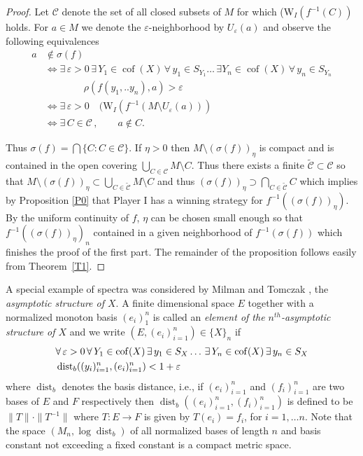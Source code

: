 \documentclass[11pt,leqno]{amsart}
\theoremstyle{definition}
\newcommand{\vp}{\varepsilon}
\newcommand{\dist}{\operatorname{dist}}
\newcommand{\cof}{\operatorname{cof}}
\newcommand{\cC}{\mathcal{C}}
\begin{document}
\begin{proof}
Let $\cC$ denote the set of all closed subsets of $M$ for
which  (W$_{I}(f^{-1}(C))$ holds. 
For $a\in M$ we denote the $\vp$-neighborhood by $U_\vp(a)$
and observe the following equivalences
\begin{align*}
a&\not\in\sigma(f)\\
&\iff\exists\, \vp>0\,\exists\, Y_1\in\cof(X)\,\forall\, y_1\in S_{Y_1}\ldots
\,\exists Y_n\in\cof(X)\,\forall\, y_n\in S_{Y_n}\\
  &\qquad\qquad \rho(f(y_1,..y_n),a)>\vp\\
  &\iff \exists\, \vp>0 \quad (\text{W}_{I}(f^{-1}(M\setminus U_\vp(a)))  \\
  &\iff \exists\, C\in\cC\,,\qquad a\not\in C.
  \end{align*}
 
Thus $\sigma(f)=\bigcap \{C:C\in \cC\}$. 
If $\eta>0$ then $M\setminus (\sigma(f))_\eta$ is compact and is 
contained in the open covering $\bigcup_{C\in\cC} M\setminus C$.
Thus there exists a finite $\tilde{\cC}\subset\cC$ so that  
$M\setminus (\sigma(f))_\eta\subset \bigcup_{C\in\tilde{\cC}} M\setminus C$ 
and thus
$(\sigma(f))_\eta\supset\bigcap_{C\in\tilde{\cC}} C$ 
which implies by Proposition \ref{P0} that Player I has a winning strategy 
for $f^{-1}((\sigma(f))_\eta)$. 
By the uniform continuity of $f$,  
$\eta$  can be chosen small enough so that
$f^{-1}((\sigma(f))_\eta)_n$ contained in a given neighborhood of 
$f^{-1}(\sigma(f))$ which finishes the proof of the first part.
The remainder of the proposition follows easily from Theorem~\ref{T1}. 
\end{proof} 
 
 
A special example of spectra was considered by Milman and Tomczak 
\cite{MT}, the {\em asymptotic structure of $X$}. 
A finite dimensional space $E$  together with a normalized monoton basis
$(e_i)_1^n$ is called an {\em element of the $n^{th}$-asymptotic 
structure of $X$}  and we write $(E,(e_i)_{i=1}^n)\in\{X\}_n$ if
\begin{align}\label{E42}
&\forall\,\vp>0\,\forall\, Y_1\in\cof(X)\,\exists\, y_1\in S_X\ldots 
\,\exists\, Y_n\in\cof(X)\,\exists\, y_n\in S_X\\
&\dist_b((y_i)_{i=1}^n,(e_i)_{i=1}^n)<1+\vp \notag
\end{align}
where $\dist_b$ denotes the basis distance, i.e.,
if $(e_i)_{i=1}^n$ and $(f_i)_{i=1}^n$ are
two  bases of $E$ and $F$ respectively then
$\dist_b((e_i)_{i=1}^n,(f_i)_{i=1}^n)$ is defined to be 
$\|T\|\cdot\|T^{-1}\|$ where $T:E\to F$ is given by 
$T(e_i)=f_i$, for $i=1,\ldots n$. 
Note that the space $(M_n,\log \dist_b)$ of all normalized 
bases of length $n$ and basis constant not exceeding a fixed 
constant is a compact metric space.
 
\end{document}
